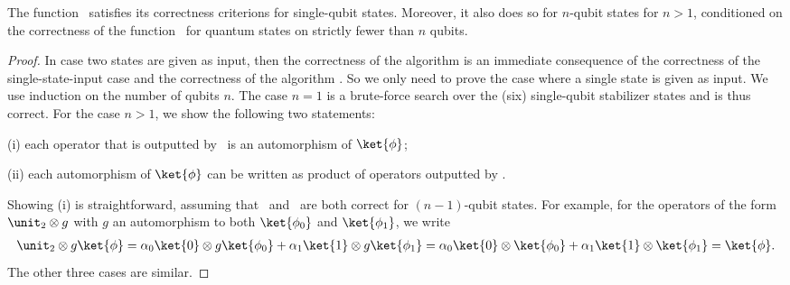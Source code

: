 




\begin{lemma}
    \label{lemma:condition-correctness-1}
    The function \getautomorphisms~satisfies its correctness criterions for single-qubit states.
    Moreover, it also does so for $n$-qubit states for $n>1$, conditioned on the correctness of the function \getsingleisomorphism~for quantum states on strictly fewer than $n$ qubits.
\end{lemma}
\begin{proof}
    In case two states are given as input, then the correctness of the algorithm is an immediate consequence of the correctness of the single-state-input case and the correctness of the algorithm \findautomorphismsetintersection.
    So we only need to prove the case where a single state is given as input.
    We use induction on the number of qubits $n$.
    The case $n=1$ is a brute-force search over the (six) single-qubit stabilizer states and is thus correct.
    For the case $n>1$, we show the following two statements:

    (i) each operator that is outputted by \getautomorphisms~is an automorphism of $\ket{\phi}$;

    (ii) each automorphism of $\ket{\phi}$ can be written as product of operators outputted by \getautomorphisms.

    Showing (i) is straightforward, assuming that \getsingleisomorphism~and \getautomorphisms~are both correct for $(n-1)$-qubit states.
    For example, for the operators of the form $\unit_2\otimes g$ with $g$ an automorphism to both $\ket{\phi_0}$ and $\ket{\phi_1}$, we write
    \begin{eqnarray*}
        \unit_2 \otimes g \ket{\phi}
        =
        \alpha_0 \ket{0} \otimes g\ket{\phi_0} + \alpha_1 \ket{1} \otimes g\ket{\phi_1}
        =
        \alpha_0 \ket{0} \otimes \ket{\phi_0} + \alpha_1 \ket{1} \otimes \ket{\phi_1}
        = \ket{\phi}
        .
    \end{eqnarray*}
    The other three cases are similar.


\end{proof}
